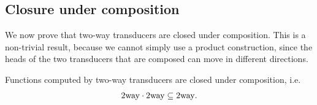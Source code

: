 \subsection{Closure under composition}
We now prove that two-way transducers are closed under composition. This is a non-trivial result, because we cannot simply use a product construction, since the heads of the two transducers that are composed can move in different directions. 

\begin{theorem}\label{thm:composition-of-two-way-transducers}
    Functions computed by two-way transducers are closed under composition, i.e.~
\begin{align*}\mathrm{2way} \cdot \mathrm{2way} \subseteq \mathrm{2way}.    
\end{align*}
\end{theorem}

